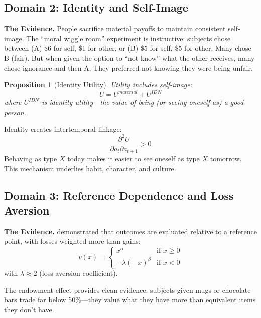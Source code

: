 \documentclass[12pt]{article}
\newtheorem{proposition}{Proposition}
\begin{document}
\subsection{Domain 2: Identity and Self-Image}

\textbf{The Evidence.} People sacrifice material payoffs to maintain consistent self-image. The ``moral wiggle room'' experiment \citep{danaberton2007} is instructive: subjects chose between (A) \$6 for self, \$1 for other, or (B) \$5 for self, \$5 for other. Many chose B (fair). But when given the option to ``not know'' what the other receives, many chose ignorance and then A. They preferred not knowing they were being unfair.

\begin{proposition}[Identity Utility]
Utility includes self-image:
\begin{equation}
U = U^{material} + U^{IDN}
\end{equation}
where $U^{IDN}$ is identity utility---the value of being (or seeing oneself as) a good person.
\end{proposition}

Identity creates intertemporal linkage:
\begin{equation}
\frac{\partial^2 U}{\partial a_t \partial a_{t+1}} > 0
\end{equation}
Behaving as type $X$ today makes it easier to see oneself as type $X$ tomorrow. This mechanism underlies habit, character, and culture.

\subsection{Domain 3: Reference Dependence and Loss Aversion}

\textbf{The Evidence.} \citet{kahnemantversky1979} demonstrated that outcomes are evaluated relative to a reference point, with losses weighted more than gains:
\begin{equation}
v(x) = \begin{cases}
x^\alpha & \text{if } x \geq 0 \\
-\lambda (-x)^\beta & \text{if } x < 0
\end{cases}
\end{equation}
with $\lambda \approx 2$ (loss aversion coefficient).

The endowment effect \citep{knetschetal1990} provides clean evidence: subjects given mugs or chocolate bars trade far below 50\%---they value what they have more than equivalent items they don't have.
\end{document}
